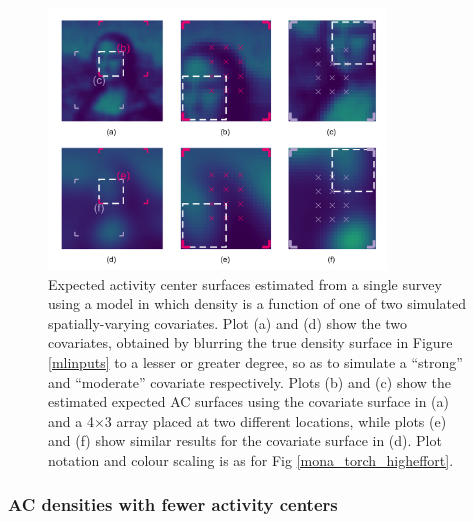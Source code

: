 \documentclass[10pt,a4paper]{article}
\begin{document}
\begin{figure}[htbp]
\centering
\includegraphics[width=0.8\textwidth]{mona_covariates.png}
\caption{Expected activity center surfaces estimated from a single survey using a model in which density is a function of one of two simulated spatially-varying covariates. Plot (a) and (d) show the two covariates, obtained by blurring the true density surface in Figure \ref{mlinputs} to a lesser or greater degree, so as to simulate a ``strong'' and ``moderate'' covariate respectively. Plots (b) and (c) show the estimated expected AC surfaces using the covariate surface in (a) and a 4$\times$3 array placed at two different locations, while plots (e) and (f) show similar results for the covariate surface in (d). Plot notation and colour scaling is as for Fig \ref{mona_torch_higheffort}.} 
\label{mona_covariates}
\end{figure}

\subsubsection{AC densities with fewer activity centers}
\end{document}
